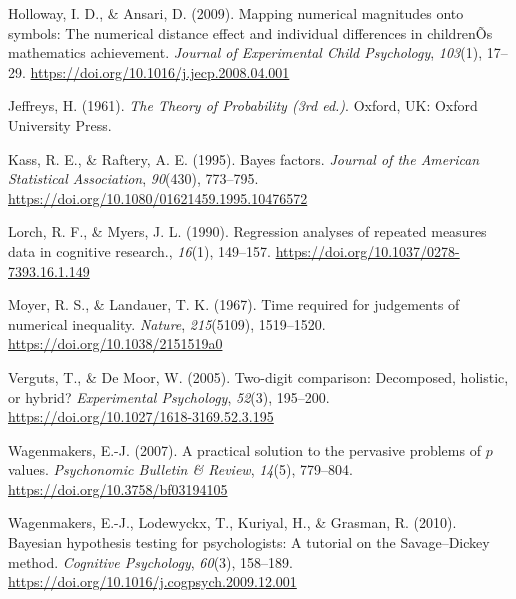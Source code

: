 \documentclass[english,,doc,floatsintext]{apa6}
\begin{document}
\leavevmode\hypertarget{ref-hollowayAnsari2009}{}%
Holloway, I. D., \& Ansari, D. (2009). Mapping numerical magnitudes onto symbols: The numerical distance effect and individual differences in childrenÕs mathematics achievement. \emph{Journal of Experimental Child Psychology}, \emph{103}(1), 17--29. \url{https://doi.org/10.1016/j.jecp.2008.04.001}

\leavevmode\hypertarget{ref-jeffreys1961}{}%
Jeffreys, H. (1961). \emph{The Theory of Probability (3rd ed.)}. Oxford, UK: Oxford University Press.

\leavevmode\hypertarget{ref-kass1995}{}%
Kass, R. E., \& Raftery, A. E. (1995). Bayes factors. \emph{Journal of the American Statistical Association}, \emph{90}(430), 773--795. \url{https://doi.org/10.1080/01621459.1995.10476572}

\leavevmode\hypertarget{ref-lorch1990}{}%
Lorch, R. F., \& Myers, J. L. (1990). Regression analyses of repeated measures data in cognitive research., \emph{16}(1), 149--157. \url{https://doi.org/10.1037/0278-7393.16.1.149}

\leavevmode\hypertarget{ref-moyer1967}{}%
Moyer, R. S., \& Landauer, T. K. (1967). Time required for judgements of numerical inequality. \emph{Nature}, \emph{215}(5109), 1519--1520. \url{https://doi.org/10.1038/2151519a0}

\leavevmode\hypertarget{ref-vergutsDeMoor2005}{}%
Verguts, T., \& De Moor, W. (2005). Two-digit comparison: Decomposed, holistic, or hybrid? \emph{Experimental Psychology}, \emph{52}(3), 195--200. \url{https://doi.org/10.1027/1618-3169.52.3.195}

\leavevmode\hypertarget{ref-wagenmakers2007}{}%
Wagenmakers, E.-J. (2007). A practical solution to the pervasive problems of \(p\) values. \emph{Psychonomic Bulletin \& Review}, \emph{14}(5), 779--804. \url{https://doi.org/10.3758/bf03194105}

\leavevmode\hypertarget{ref-wagenmakers2010}{}%
Wagenmakers, E.-J., Lodewyckx, T., Kuriyal, H., \& Grasman, R. (2010). Bayesian hypothesis testing for psychologists: A tutorial on the Savage--Dickey method. \emph{Cognitive Psychology}, \emph{60}(3), 158--189. \url{https://doi.org/10.1016/j.cogpsych.2009.12.001}
\end{document}
